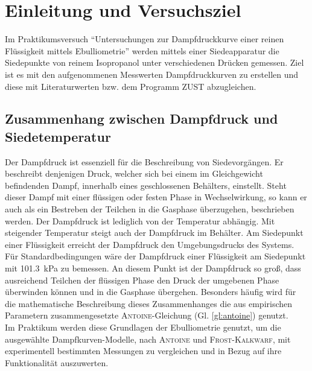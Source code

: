 \section{Einleitung und Versuchsziel}
\label{sec:aufgabenstellung}

Im Praktikumsversuch "`Untersuchungen zur Dampfdruckkurve einer reinen Flüssigkeit mittels Ebulliometrie"' werden mittels einer Siedeapparatur die Siedepunkte von reinem Isopropanol unter verschiedenen Drücken gemessen. Ziel ist es mit den aufgenommenen Messwerten Dampfdruckkurven zu erstellen und diese mit Literaturwerten bzw. dem Programm \textsc{ZUST} abzugleichen.

\subsection*{Zusammenhang zwischen Dampfdruck und Siedetemperatur}
Der Dampfdruck ist essenziell für die Beschreibung von Siedevorgängen. Er beschreibt denjenigen Druck, welcher sich bei einem im Gleichgewicht befindenden Dampf, innerhalb eines geschlossenen Behälters,  einstellt. Steht dieser Dampf mit einer flüssigen oder festen Phase in Wechselwirkung, so kann er auch als ein Bestreben der Teilchen in die Gasphase überzugehen, beschrieben werden. Der Dampfdruck ist lediglich von der Temperatur abhängig. Mit steigender Temperatur steigt auch der Dampfdruck im Behälter. \linebreak
Am Siedepunkt einer Flüssigkeit erreicht der Dampfdruck den Umgebungsdrucks des Systems. Für Standardbedingungen wäre der Dampfdruck einer Flüssigkeit am Siedepunkt mit \SI{101,3}{\kilo \pascal} zu bemessen. An diesem Punkt ist der Dampfdruck so groß, dass ausreichend Teilchen der flüssigen Phase den Druck der umgebenen Phase überwinden können und in die Gasphase übergehen.  
Besonders häufig wird für die mathematische Beschreibung dieses Zusammenhanges die aus empirischen Parametern zusammengesetzte \textsc{Antoine}-Gleichung (Gl. \ref{gl:antoine}) genutzt.\\
Im Praktikum werden diese Grundlagen der Ebulliometrie genutzt, um die ausgewählte Dampfkurven-Modelle, nach \textsc{Antoine} und \textsc{Frost-Kalkwarf}, mit experimentell bestimmten Messungen zu vergleichen und in Bezug auf ihre Funktionalität auszuwerten.\\

